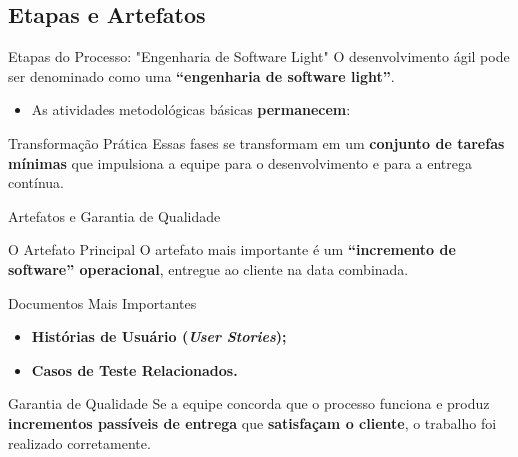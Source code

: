 \documentclass[aspectratio=169, 9pt]{beamer}
\begin{document}
\subsection{Etapas e Artefatos}
\begin{frame}{Etapas do Processo: "Engenharia de Software Light"}
  O desenvolvimento ágil pode ser denominado como uma \textbf{“engenharia de software light”}.

  \vspace{0.2cm}
  \begin{itemize}
    \item As atividades metodológicas básicas \textbf{permanecem}:
  \end{itemize}

  \vspace{0.2cm}
  \centering

  \vspace{0.3cm}
  \begin{block}{Transformação Prática}
    Essas fases se transformam em um \textbf{conjunto de tarefas mínimas} que impulsiona a equipe para o desenvolvimento e para a entrega contínua.
  \end{block}
\end{frame}

\begin{frame}{Artefatos e Garantia de Qualidade}
  \begin{block}{O Artefato Principal}
    O artefato mais importante é um \textbf{“incremento de software” operacional}, entregue ao cliente na data combinada.
  \end{block}

  \vspace{0.2cm}
  \begin{block}{Documentos Mais Importantes}
    \begin{itemize}
      \item \textbf{Histórias de Usuário (\textit{User Stories});}
      \item \textbf{Casos de Teste Relacionados.}
    \end{itemize}
  \end{block}

  \vspace{0.2cm}
  \begin{block}{Garantia de Qualidade}
    Se a equipe concorda que o processo funciona e produz \textbf{incrementos passíveis de entrega} que \textbf{satisfaçam o cliente}, o trabalho foi realizado corretamente.
  \end{block}
\end{frame}
\end{document}
